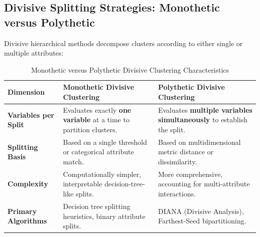 \clearpage
\subsection{Divisive Splitting Strategies: Monothetic versus Polythetic}
Divisive hierarchical methods decompose clusters according to either single or multiple attributes:

\begin{table}[!htbp]
\centering
\caption{Monothetic versus Polythetic Divisive Clustering Characteristics}
\label{tab:monothetic_vs_polythetic}
\vspace{0.2em}
\renewcommand{\arraystretch}{1.3}
\begin{tabularx}{\textwidth}{>{\bfseries}lXX}
\toprule
Dimension & Monothetic Divisive Clustering & Polythetic Divisive Clustering \\
\midrule
Variables per Split & Evaluates exactly \textbf{one variable} at a time to partition clusters. & Evaluates \textbf{multiple variables simultaneously} to establish the split. \\
Splitting Basis & Based on a single threshold or categorical attribute match. & Based on multidimensional metric distance or dissimilarity. \\
Complexity & Computationally simpler, interpretable decision-tree-like splits. & More comprehensive, accounting for multi-attribute interactions. \\
Primary Algorithms & Decision tree splitting heuristics, binary attribute splits. & DIANA (Divisive Analysis), Farthest-Seed bipartitioning. \\
\bottomrule
\end{tabularx}
\end{table}

